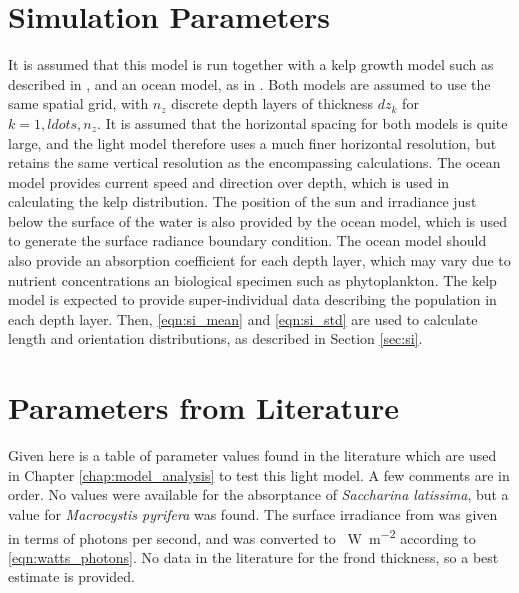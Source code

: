 \documentclass[ms,cpyr,lof,lot]{uathesis}
\begin{document}
\section{Simulation Parameters}
It is assumed that this model is run together with a kelp growth model such as described in \citep{broch_modelling_2012}, and an ocean model, as in \citep{wassmann_modelling_2006}.
Both models are assumed to use the same spatial grid, with $n_z$ discrete depth layers of thickness $dz_k$ for $k=1,ldots,n_z$.
It is assumed that the horizontal spacing for both models is quite large, and the light model therefore uses a much finer horizontal resolution,
but retains the same vertical resolution as the encompassing calculations.
The ocean model provides current speed and direction over depth, which is used in calculating the kelp distribution.
The position of the sun and irradiance just below the surface of the water is also provided by the ocean model, which is used to generate the surface radiance boundary condition.
The ocean model should also provide an absorption coefficient for each depth layer, which may vary due to nutrient concentrations an biological specimen such as phytoplankton.
The kelp model is expected to provide super-individual data describing the population in each depth layer.
Then, \eqref{eqn:si_mean} and \eqref{eqn:si_std} are used to calculate length and orientation distributions, as described in Section \ref{sec:si}.

\section{Parameters from Literature}
Given here is a table of parameter values found in the literature which are used in Chapter \ref{chap:model_analysis} to test this light model.
A few comments are in order.
No values were available for the absorptance of \textit{Saccharina latissima}, but a value for \textit{Macrocystis pyrifera} was found.
The surface irradiance from \cite{broch_modelling_2012} was given in terms of photons per second,
and was converted to \SI{}{\W\per\m\squared} according to \eqref{eqn:watts_photons}.
No data in the literature for the frond thickness, so a best estimate is provided.
\end{document}
